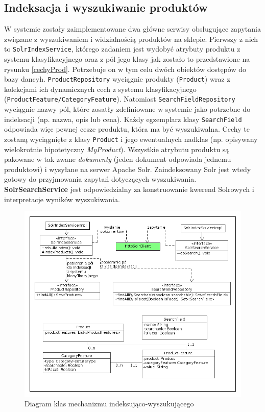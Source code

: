 \subsection{Indeksacja i wyszukiwanie produktów}
W systemie zostały zaimplementowane dwa główne serwisy obsługujące zapytania związane z wyszukiwaniem i widzialnością produktów na sklepie. Pierwszy z nich to \texttt{SolrIndexService}, którego zadaniem jest wydobyć atrybuty produktu z systemu klasyfikacyjnego oraz z pól jego klasy jak zostało to przedstawione na rysunku \ref{cechyProd}. Potrzebuje on w tym celu dwóch obiektów dostępów do bazy dancyh. \texttt{ProductRepository} wyciągnie produkty (\texttt{Product}) wraz z kolekcjami ich dynamicznych cech z systemu klasyfikacyjnego (\texttt{ProductFeature/CategoryFeature}). Natomiast \texttt{SearchFieldRepository} wyciągnie nazwy pól, które zosatły zdefiniowane w systemie jako potrzebne do indeksacji (np. nazwa, opis lub cena). Każdy egzemplarz klasy \texttt{SearchField} odpowiada więc pewnej cesze produktu, która ma być wyszukiwalna. Cechy te zostaną wyciągnięte z klasy \texttt{Product} i jego ewentualnych nadklas (np. opisywany wielokrotnie hipotetyczny \textit{MyProduct}). Wszystkie atrybutu produktu są pakowane w tak zwane \textit{dokumenty} (jeden dokument odpowiada jednemu produktowi) i wysyłane na serwer Apache Solr. Zaindeksowany Solr jest wtedy gotowy do przyjmowania zapytań dotyczących wyszukiwania. \textbf{SolrSearchService} jest odpowiedzialny za konstruowanie kwerend Solrowych i interpretacje wyników wyszukiwania.
\begin{figure}
	\begin{center}
		\includegraphics[scale=0.4]{klasy_solr.png}
	\end{center}
	\caption{{\color{black}Diagram klas mechanizmu indeksująco-wyszukującego}} \label{klasy_solr}
\end{figure}

